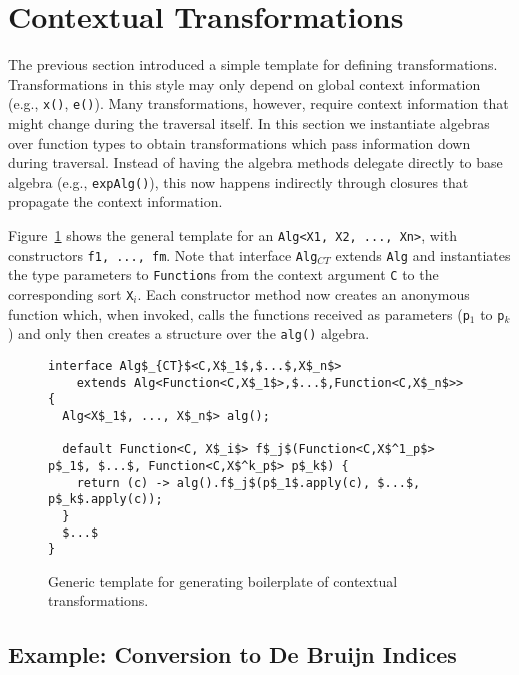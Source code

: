 \section{Contextual Transformations}\label{sec:contexttrans}

The previous section introduced a simple template for defining
transformations. Transformations in this style may only depend on
global context information (e.g., \lstinline{x()}, \lstinline{e()}).
Many transformations, however, require context information that might
change during the traversal itself. In this section we instantiate
algebras over function types to obtain transformations which pass
information down during traversal. Instead of having the algebra
methods delegate directly to base algebra (e.g.,
\lstinline{expAlg()}), this now happens indirectly through closures
that propagate the context information.

Figure~\ref{ctxTrafoTemplate} shows the general template for an \lstinline{Alg<X1, X2, ..., Xn>}, with constructors \lstinline{f1, ..., fm}.
Note that interface \lstinline{Alg}$_{CT}$ extends \lstinline{Alg} and instantiates the type parameters to \lstinline{Function}s from the context argument \lstinline{C} to the corresponding sort \lstinline{X}$_i$.
Each constructor method now creates an anonymous function which, when invoked, calls the functions received as parameters (\lstinline{p}$_1$ to \lstinline{p}$_k$) and only then creates a structure over the \lstinline{alg()} algebra.

\begin{figure}[t]
\nocaptionrule
\begin{lstlisting}[mathescape=true]
interface Alg$_{CT}$<C,X$_1$,$...$,X$_n$>
    extends Alg<Function<C,X$_1$>,$...$,Function<C,X$_n$>> {
  Alg<X$_1$, ..., X$_n$> alg();

  default Function<C, X$_i$> f$_j$(Function<C,X$^1_p$> p$_1$, $...$, Function<C,X$^k_p$> p$_k$) {
    return (c) -> alg().f$_j$(p$_1$.apply(c), $...$, p$_k$.apply(c));
  }
  $...$
}
\end{lstlisting}
\caption{Generic template for generating boilerplate of contextual transformations.}
\label{ctxTrafoTemplate}
\end{figure}

\subsection{Example: Conversion to De Bruijn Indices}\label{subsec:debruign_example}

